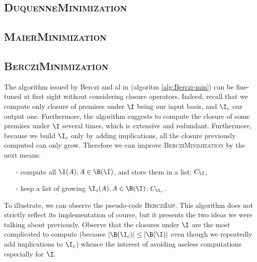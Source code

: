 \subsection{\textsc{DuquenneMinimization}}

\subsection{\textsc{MaierMinimization}}

\begin{figure}[ht]
	
\end{figure}

\subsection{\textsc{BercziMinimization}}

The algorithm issued by Berczi and al in \cite{berczi_directed_2017} (algoritm \ref{alg:Berczi-min}) can be fine-tuned at first sight without considering closure operators. Indeed, recall that we compute only closure of premises under
$\I$ being our input basis, and $\I_c$ our output one. Furthermore, the algorithm suggests to compute the closure of some premises under $\I$ several 
times, which is extensive and redundant. Furthermore, because we build $\I_c$ only by adding implications, all the closure previously computed can only grow.
Therefore we can improve \textsc{BercziMinimization} by the next means:
\begin{itemize}
	\item[-] compute all $\I(A), A \in \B(\I)$, and store them in a list: $C_{\I}$,
	\item[-] keep a list of growing $\I_c(A), A \in \B(\I)$: $C_{\I_c}$.
\end{itemize}
\noindent To illustrate, we can observe the pseudo-code \textsc{BercziImp}. This algorithm does not strictly reflect its implementation of course, but it
presents the two ideas we were talking about previously. Observe that the closures under $\I$ are the most complicated to compute (because $|\B(\I_c)| \leq |\B(\I)|$ even though we repeatedly add implications to $\I_c$) whence
the interest of avoiding useless computations especially for $\I$.

